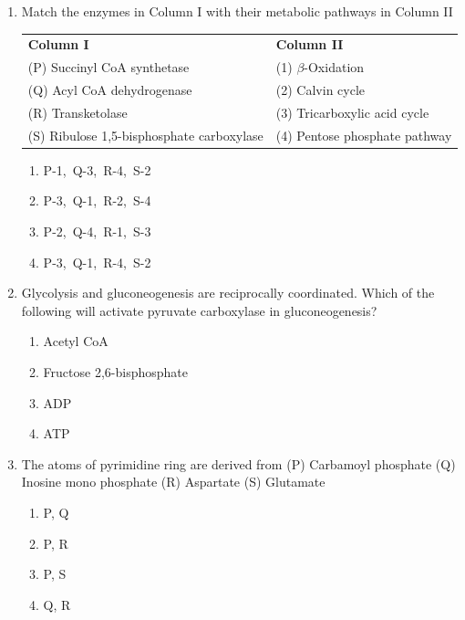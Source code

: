 \documentclass[journal,12pt,onecolumn]{IEEEtran}
\begin{document}
\begin{enumerate}
\item Match the enzymes in Column I with their metabolic pathways in Column II

\noindent
\begin{tabular}{p{8cm} p{6cm}}
\textbf{Column I} & \textbf{Column II} \\
(P) Succinyl CoA synthetase & (1) $\beta$-Oxidation \\
(Q) Acyl CoA dehydrogenase & (2) Calvin cycle \\
(R) Transketolase & (3) Tricarboxylic acid cycle \\
(S) Ribulose 1,5-bisphosphate carboxylase & (4) Pentose phosphate pathway
\end{tabular}

\begin{multicols}{2}
\begin{enumerate}[label=(\Alph*)]
\item P-1,\ Q-3,\ R-4,\ S-2
\item  P-3,\ Q-1,\ R-2,\ S-4
\item   P-2,\ Q-4,\ R-1,\ S-3
\item    P-3,\ Q-1,\ R-4,\ S-2
\end{enumerate}
\end{multicols}
\item Glycolysis and gluconeogenesis are reciprocally coordinated. Which of the following will activate pyruvate carboxylase in gluconeogenesis?
\begin{multicols}{2}
\begin{enumerate}[label=(\Alph*)]
\item Acetyl CoA
\item Fructose 2,6-bisphosphate
\item ADP
\item ATP
\end{enumerate}
\end{multicols}

\item The atoms of pyrimidine ring are derived from  
(P) Carbamoyl phosphate \quad (Q) Inosine mono phosphate \quad (R) Aspartate \quad (S) Glutamate
\begin{multicols}{2}
\begin{enumerate}[label=(\Alph*)]
\item P, Q
\item P, R
\item P, S
\item Q, R
\end{enumerate}
\end{multicols}


\end{enumerate}
\end{document}

